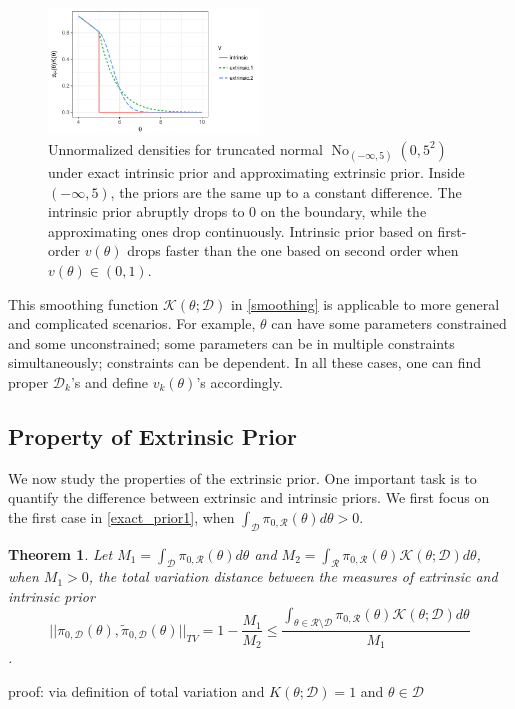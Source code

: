 \documentclass[10pt]{article}
\newtheorem{theorem}{Theorem}
\newcommand{\mc}[1]{\mathcal{#1}}
\DeclareMathOperator{\No}{No}
\DeclareMathOperator{\1}{\mathbbm{1}}
\begin{document}
\begin{figure}[H]
 \centering
 \includegraphics[width=0.5\textwidth]{density_truncated_normal}
\caption{Unnormalized densities for truncated normal $\No_{(-\infty,5)}(0,5^2)$ under exact intrinsic prior and approximating extrinsic prior. Inside $(-\infty,5)$, the priors are the same up to a constant difference. The intrinsic prior abruptly drops to $0$ on the boundary, while the approximating ones drop continuously. Intrinsic prior based on first-order $v(\theta)$ drops faster than the one based on second order when $v(\theta)\in (0,1)$.}
\label{truncated_normal}
\end{figure}

This smoothing function $\mc K(\theta;\mc D)$ in \eqref{smoothing} is applicable to more general and complicated scenarios. For example, $\theta$ can have some parameters constrained and some unconstrained; some parameters can be in multiple constraints simultaneously; constraints can be dependent. In all these cases, one can find proper $\mc D_k$'s and define $v_k(\theta)$'s accordingly.

\subsection{Property of Extrinsic Prior}

We now study the properties of the extrinsic prior. One important task is to quantify the difference between extrinsic and intrinsic priors. We first focus on the first case in \eqref{exact_prior1}, when $\int_{\mc D} \pi_{0,\mc R}(\theta)d\theta>0$.

\begin{theorem}
Let $M_1= \int_{\mc D} \pi_{0,\mc R}(\theta)d\theta$ and $M_2 = \int_{\mc R} \pi_{0,\mc R}(\theta) \mc K(\theta;\mc D)d\theta$, when $M_1>0$, the total variation distance between the measures of extrinsic and intrinsic prior
$$||\pi_{0,\mc D}(\theta), \tilde{\pi}_{0,\mc D}(\theta) ||_{TV} = 1 - \frac{M_1}{M_2} \le \frac{\int_{\theta  \in \mc R \setminus \mc D} \pi_{0,\mc R}(\theta) \mc K(\theta;\mc D)d\theta}{M_1}$$.
\end{theorem}
proof:
{via definition of total variation and $K(\theta;\mc D)=1$ and $\theta\in\mc D$}
\end{document}
